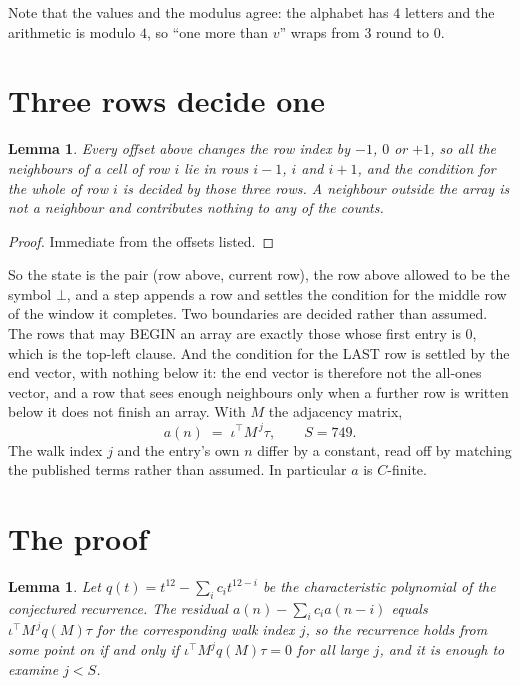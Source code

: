 \documentclass[11pt,a4paper]{article}
\theoremstyle{plain}
\newtheorem{lemma}[theorem]{Lemma}
\theoremstyle{definition}
\begin{document}
Note that the values and the modulus agree: the alphabet has $4$ letters and the arithmetic
is modulo $4$, so ``one more than $v$'' wraps from $3$ round to $0$.

\section{Three rows decide one}

\begin{lemma}\label{lem:win}
Every offset above changes the row index by $-1$, $0$ or $+1$, so all the neighbours of a cell
of row $i$ lie in rows $i-1$, $i$ and $i+1$, and the condition for the whole of row $i$ is
decided by those three rows. A neighbour outside the array is not a neighbour and contributes
nothing to any of the counts.
\end{lemma}

\begin{proof}
Immediate from the offsets listed.
\end{proof}

So the state is the pair (row above, current row), the row above allowed to be the symbol
$\bot$, and a step appends a row and settles the condition for the middle row of the window it
completes. Two boundaries are decided rather than assumed. The rows that may BEGIN an array are
exactly those whose first entry is $0$, which is the top-left clause. And the condition for the
LAST row is settled by the end vector, with nothing below it: the end vector is therefore not
the all-ones vector, and a row that sees enough neighbours only when a further row is written
below it does not finish an array. With $M$ the adjacency matrix,
\[
a(n)\;=\;\iota^{\!\top}M^{\,j}\tau ,\qquad S=749.
\]
The walk index $j$ and the entry's own $n$ differ by a constant, read off by matching the
published terms rather than assumed. In particular $a$ is $C$-finite.

\section{The proof}

\begin{lemma}\label{lem:crit}
Let $q(t)=t^{12}-\sum_i c_it^{12-i}$ be the characteristic polynomial of the
conjectured recurrence. The residual $a(n)-\sum_ic_ia(n-i)$ equals
$\iota^{\!\top}M^{\,j}q(M)\tau$ for the corresponding walk index $j$, so the recurrence
holds from some point on if and only if $\iota^{\!\top}M^{j}q(M)\tau=0$ for all large $j$,
and it is enough to examine $j<S$.
\end{lemma}
\end{document}
